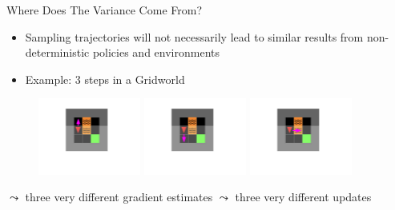 \documentclass[aspectratio=169]{../latex_main/tntbeamer}  %
\begin{document}
\begin{frame}[c]{Where Does The Variance Come From?}
	
\begin{itemize}
	\item Sampling trajectories will not necessarily lead to similar results from non-deterministic policies and environments
    \item Example: 3 steps in a Gridworld
\end{itemize}

 \begin{figure}
     \centering
\includegraphics[width=0.3\textwidth]{w07_2_policy_gradient_methods/images/grid1.pdf}
\includegraphics[width=0.3\textwidth]{w07_2_policy_gradient_methods/images/grid2.pdf}
\includegraphics[width=0.3\textwidth]{w07_2_policy_gradient_methods/images/grid3.pdf}
     \label{fig:enter-label}
 \end{figure}

	$\leadsto$ three very different gradient estimates
    \pause 
    \newline
    $\leadsto$ \alert{three very different updates}
\end{frame}
\end{document}
